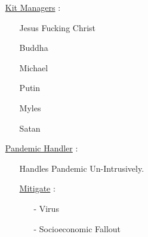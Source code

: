 \documentclass[11pt]{article}
\begin{document}
\begin{enumerate}
	\item[] \ul{Kit Managers} :
	\begin{enumerate}
		\item[] Jesus Fucking Christ
		\item[] Buddha
		\item[] Michael
		\item[] Putin
		\item[] Myles
		\item[] Satan
	\end{enumerate}

	\item[] \ul{Pandemic Handler} :
	\begin{enumerate}
		\item[] Handles Pandemic Un-Intrusively.
		
		\item[] \ul{Mitigate} :
		\begin{enumerate}
			\item[-] Virus
			\item[-] Socioeconomic Fallout
		\end{enumerate}
	\end{enumerate}

\end{enumerate}
\end{document}
